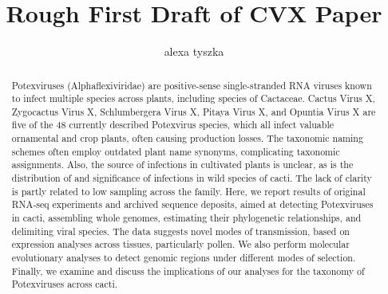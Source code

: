 \documentclass{article}
\title{Rough First Draft of CVX Paper}
\author{alexa tyszka}
\date{}
\begin{document}
\maketitle
\begin{abstract}

Potexviruses (Alphaflexiviridae) are positive-sense single-stranded RNA viruses known to infect multiple species across plants, including species of Cactaceae. Cactus Virus X, Zygocactus Virus X, Schlumbergera Virus X, Pitaya Virus X, and Opuntia Virus X are five of the 48 currently described Potexvirus species, which all infect valuable ornamental and crop plants, often causing production losses. 
The taxonomic naming schemes often employ outdated plant name synonyms, complicating taxonomic assignments. Also, the source of infections in cultivated plants is unclear, as is the distribution of and significance of infections in wild species of cacti. The lack of clarity is partly related to low sampling across the family. Here, we report results of original RNA-seq experiments and archived sequence deposits, aimed at detecting Potexviruses in cacti, assembling whole genomes, estimating their phylogenetic relationships, and delimiting viral species. The data suggests novel modes of transmission, based on expression analyses across tissues, particularly pollen. We also perform molecular evolutionary analyses to detect genomic regions under different modes of selection. Finally, we examine and discuss the implications of our analyses for the taxonomy of Potexviruses across cacti.  
\end{abstract}
\end{document}
